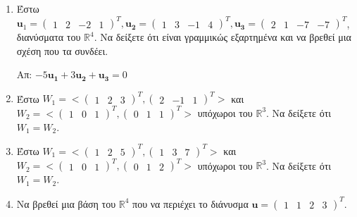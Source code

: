 \begin{enumerate}
    \item Έστω $ \mathbf{u}_{1} = 
            \begin{pmatrix}1 & 2 & -2 & 1\end{pmatrix}^{T}, \mathbf{u_{2}} = 
            \begin{pmatrix}1 & 3 & -1 &4\end{pmatrix}^{T}, \mathbf{u_{3}} = 
            \begin{pmatrix}2 & 1 & -7 & -7\end{pmatrix}^{T} $, 
            διανύσματα του $ \mathbb{R}^{4} $. Να δείξετε ότι είναι 
            γραμμικώς εξαρτημένα και να βρεθεί μια σχέση που τα συνδέει.

            \hfill Απ: $ -5 \mathbf{u_{1}}+ 3 \mathbf{u_{2}} + \mathbf{u_{3}}=0 $ 

        \item Έστω $ W_{1} = < 
            \begin{pmatrix}1 & 2 & 3\end{pmatrix}^{T}, 
            \begin{pmatrix}2 & -1 & 1\end{pmatrix}^{T} > $ και $ W_{2} = < 
            \begin{pmatrix}1 & 0 & 1\end{pmatrix}^{T}, 
            \begin{pmatrix}0 & 1 & 1\end{pmatrix}^{T}> $ υπόχωροι του 
            $ \mathbb{R}^{3} $.  Να δείξετε ότι $ W_{1} = W_{2} $.

        \item Έστω $ W_{1} = < 
            \begin{pmatrix}1 & 2 & 5\end{pmatrix}^{T}, 
            \begin{pmatrix}1 & 3 & 7\end{pmatrix}^{T} > $ και $ W_{2} = < 
            \begin{pmatrix}1 & 0 & 1\end{pmatrix}^{T}, 
            \begin{pmatrix}0 & 1 & 2\end{pmatrix}^{T}> $ υπόχωροι του 
            $ \mathbb{R}^{3} $.  Να δείξετε ότι $ W_{1} = W_{2} $.

        \item Να βρεθεί μια βάση του $ \mathbb{R}^{4} $ που να 
            περιέχει το διάνυσμα $ \mathbf{u} = 
            \begin{pmatrix}1 & 1 & 2 & 3\end{pmatrix}^{T} $.


\end{enumerate}
